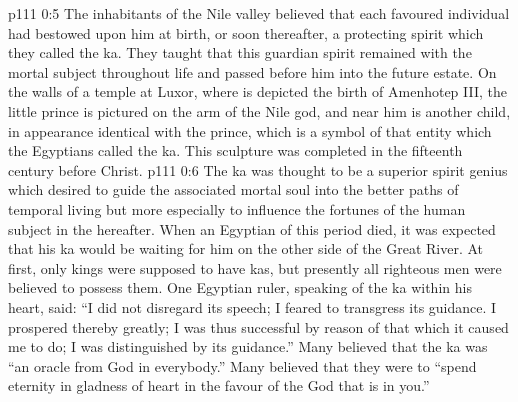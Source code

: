 \vs p111 0:5 The inhabitants of the Nile valley believed that each favoured individual had bestowed upon him at birth, or soon thereafter, a protecting spirit which they called the ka. They taught that this guardian spirit remained with the mortal subject throughout life and passed before him into the future estate. On the walls of a temple at Luxor, where is depicted the birth of Amenhotep III, the little prince is pictured on the arm of the Nile god, and near him is another child, in appearance identical with the prince, which is a symbol of that entity which the Egyptians called the ka. This sculpture was completed in the fifteenth century before Christ.
\vs p111 0:6 The ka was thought to be a superior spirit genius which desired to guide the associated mortal soul into the better paths of temporal living but more especially to influence the fortunes of the human subject in the hereafter. When an Egyptian of this period died, it was expected that his ka would be waiting for him on the other side of the Great River. At first, only kings were supposed to have kas, but presently all righteous men were believed to possess them. One Egyptian ruler, speaking of the ka within his heart, said: “I did not disregard its speech; I feared to transgress its guidance. I prospered thereby greatly; I was thus successful by reason of that which it caused me to do; I was distinguished by its guidance.” Many believed that the ka was “an oracle from God in everybody.” Many believed that they were to “spend eternity in gladness of heart in the favour of the God that is in you.”
